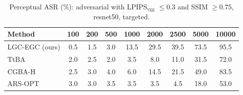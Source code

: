 \begin{table}[t]
\centering\footnotesize
\caption{Perceptual ASR (\%): adversarial with LPIPS$_{\mathrm{vgg}}$ $\le 0.3$ and SSIM $\ge 0.75$, resnet50, targeted.}
\begin{tabular}{lcccccccc}
\toprule
Method & 100 & 200 & 500 & 1000 & 2000 & 2500 & 5000 & 10000 \\
\midrule
LGC-EGC (ours) & 0.5 & 1.5 & 3.0 & 13.5 & 29.5 & 39.5 & 73.5 & 95.5 \\
TtBA & 2.0 & 2.5 & 2.0 & 3.5 & 8.0 & 11.0 & 31.5 & 72.0 \\
CGBA-H & 2.5 & 3.0 & 4.0 & 6.0 & 14.5 & 21.5 & 49.0 & 83.5 \\
ARS-OPT & 3.0 & 3.0 & 3.5 & 3.5 & 3.5 & 4.5 & 18.0 & 53.0 \\
\bottomrule
\end{tabular}
\end{table}
